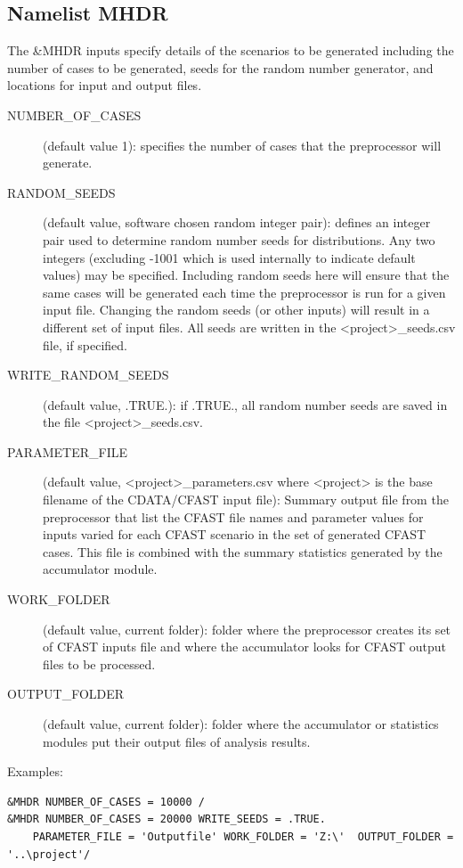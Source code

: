 \documentclass[12pt,twoside]{book}
\begin{document}
\subsection{Namelist MHDR}

The {\ct \&MHDR} inputs specify details of the scenarios to be generated including the number of cases to be generated, seeds for the random number generator, and locations for input and output files.

\begin{description}
  \item[NUMBER\_OF\_CASES] (default value 1): specifies the number of cases that the preprocessor will generate.
  \item[RANDOM\_SEEDS] (default value, software chosen random integer pair): defines an integer pair used to determine random number seeds for distributions. Any two integers (excluding -1001 which is used internally to indicate default values) may be specified. Including random seeds here will ensure that the same cases will be generated each time the preprocessor is run for a given input file. Changing the random seeds (or other inputs) will result in a different set of input files.  All seeds are written in the {\ct <project>\_seeds.csv} file, if specified.
  \item[WRITE\_RANDOM\_SEEDS] (default value, .TRUE.): if .TRUE., all random number seeds are saved in the file {\ct <project>\_seeds.csv}.
  \item[PARAMETER\_FILE] (default value, {\ct <project>\_parameters.csv} where {\ct <project>} is the base filename of the CDATA/CFAST input file): Summary output file from the preprocessor that list the CFAST file names and parameter values for inputs varied for each CFAST scenario in the set of generated CFAST cases. This file is combined with the summary statistics generated by the accumulator module.
  \item[WORK\_FOLDER] (default value, current folder): folder where the preprocessor creates its set of CFAST inputs file and where the accumulator looks for CFAST output files to be processed.
  \item[OUTPUT\_FOLDER] (default value, current folder): folder where the accumulator or statistics modules put their output files of analysis results.
\end{description}

\vspace{\baselineskip}
\noindent Examples:
\begin{lstlisting}
&MHDR NUMBER_OF_CASES = 10000 /
&MHDR NUMBER_OF_CASES = 20000 WRITE_SEEDS = .TRUE.
	PARAMETER_FILE = 'Outputfile' WORK_FOLDER = 'Z:\'  OUTPUT_FOLDER = '..\project'/
\end{lstlisting}
\end{document}
